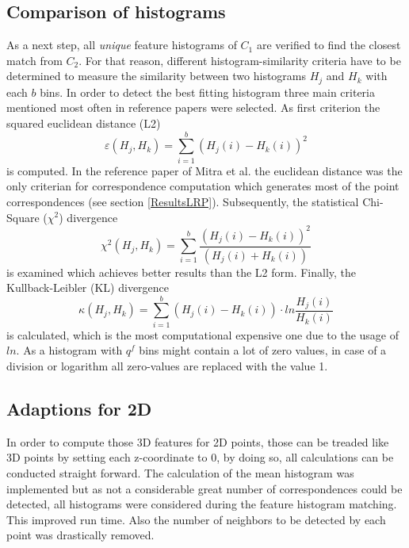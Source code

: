 \subsection{Comparison of histograms}
\label{histogramCriteria}

As a next step, all \textit{unique} feature histograms of $C_1$ are verified to find the closest match from $C_2$. For that reason, different histogram-similarity criteria have to be determined to measure the similarity between two histograms $H_j$ and $H_k$ with each $b$ bins. In order to detect the best fitting histogram three main criteria mentioned most often in reference papers \cite{surfletPairRelation} \cite{localFeatureHistograms} were selected. As first criterion the squared euclidean distance (L2)
\begin{equation}
\varepsilon(H_j, H_k) = \displaystyle\sum_{i=1}^{b}(H_j(i) - H_k(i))^2
\end{equation}
is computed. In the reference paper of Mitra et al. \cite{Mitra07} the euclidean distance was the only criterian for correspondence computation which generates most of the point correspondences (see section \ref{ResultsLRP}). Subsequently, the statistical Chi-Square ($\chi^2$) divergence
\begin{equation}
\chi^2(H_j, H_k) = \displaystyle\sum_{i=1}^{b}\frac{(H_j(i) - H_k(i))^2}{(H_j(i) + H_k(i))}
\end{equation}
is examined which achieves better results than the L2 form. Finally, the Kullback-Leibler (KL) divergence
\begin{equation}
\kappa(H_j, H_k) = \displaystyle\sum_{i=1}^{b}(H_j(i) - H_k(i)) \cdot ln \frac{H_j(i)}{H_k(i)}
\end{equation}
is calculated, which is the most computational expensive one due to the usage of $ln$. As a histogram with $q^f$ bins might contain a lot of zero values, in case of a division or logarithm all zero-values are replaced with the value 1.

\subsection{Adaptions for 2D}
In order to compute those 3D features for 2D points, those can be treaded like 3D points by setting each z-coordinate to 0, by doing so, all calculations can be conducted straight forward. 
The calculation of the mean histogram was implemented but as not a considerable great number of correspondences could be detected, all histograms were considered during the feature histogram matching. This improved run time. Also the number of neighbors to be detected by each point was drastically removed. 

